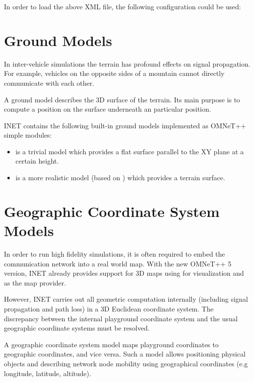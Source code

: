 In order to load the above XML file, the following configuration could be
used:


\section{Ground Models}

In inter-vehicle simulations the terrain has profound effects on signal
propagation. For example, vehicles on the opposite sides of a mountain
cannot directly communicate with each other.

A ground model describes the 3D surface of the terrain. Its main purpose is
to compute a position on the surface underneath an particular position.

INET contains the following built-in ground models implemented as
OMNeT++ simple modules:

\begin{itemize}
        \item {} is a trivial model which provides a flat surface parallel to the XY plane at a certain height.
        \item {} is a more realistic model (based on ) which provides a terrain surface.
\end{itemize}

\section{Geographic Coordinate System Models}

In order to run high fidelity simulations, it is often required to embed
the communication network into a real world map. With the new OMNeT++ 5
version, INET already provides support for 3D maps using
 for visualization and  as the map
provider.

However, INET carries out all geometric computation internally (including
signal propagation and path loss) in a 3D Euclidean coordinate system. The
discrepancy between the internal playground coordinate system and the usual
geographic coordinate systems must be resolved.

A geographic coordinate system model maps playground coordinates to
geographic coordinates, and vice versa. Such a model allows positioning
physical objects and describing network node mobility using geographical
coordinates (e.g longitude, latitude, altitude).

